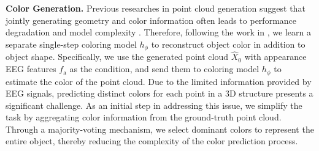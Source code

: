 \textbf{Color Generation.}
Previous researches in point cloud generation suggest that jointly generating geometry and color information often leads to performance degradation and model complexity \cite{melas2023pc2,wu2023sketch}.
Therefore, following the work in \cite{melas2023pc2}, we learn a separate single-step coloring model $h_{\phi}$ to reconstruct object color in addition to object shape. 
Specifically, we use the generated point cloud $\hat{X}_0$ with appearance EEG features $f_\mathrm{a}$ as the condition, and send them to coloring model $h_{\phi}$ to estimate the color of the point cloud.
Due to the limited information provided by EEG signals, predicting distinct colors for each point in a 3D structure presents a significant challenge. As an initial step in addressing this issue,
we simplify the task by aggregating color information from the ground-truth point cloud. Through a majority-voting mechanism, we select dominant colors to represent the entire object, thereby reducing the complexity of the color prediction process.
